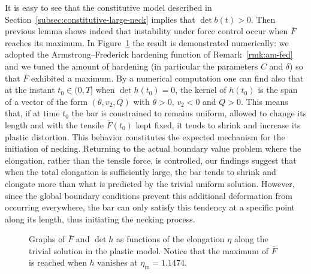 \documentclass[a4paper,10pt,twoside]{amsbook}
\numberwithin{section}{chapter}
\numberwithin{equation}{chapter}
\theoremstyle{definition}
\begin{document}
It is easy to see that the constitutive model described in Section~\ref{subsec:constitutive-large-neck} implies that $\det b(t)>0$. Then previous lemma shows indeed that instability under force control occur when $\bar F$ reaches its maximum. In Figure~\ref{fig:instabilitypl} the result is demonstrated numerically: we adopted the Armstrong--Frederick hardening function of Remark~\ref{rmk:am-fed} and we tuned the amount of hardening (in particular the parameters $C$ and $\delta$) so that $\bar{F}$ exhibited a maximum. By a numerical computation one can find also that at the instant $t_0\in(0,T]$ when $\det h(t_0)=0$, the kernel of $h(t_0)$ is the span of a vector of the form $(\theta,v_2,Q)$ with $\theta>0$, $v_2<0$ and $Q>0$. This means that, if at time $t_0$ the bar is constrained to remains uniform, allowed to change its length and with the tensile $\bar{F}(t_0)$ kept fixed, it tends to shrink and increase its plastic distortion. This behavior constitutes the expected mechanism for the initiation of necking. Returning to the actual boundary value problem where the elongation, rather than the tensile force, is controlled, our findings suggest that when the total elongation is sufficiently large, the bar tends to shrink and elongate more than what is predicted by the trivial uniform solution. However, since the global boundary conditions prevent this additional deformation from occurring everywhere, the bar can only satisfy this tendency at a specific point along its length, thus initiating the necking process.
\begin{figure}[htp]
\hfill
{}
\caption{Graphs of $\bar F$ and $\det h$ as functions of the elongation $\eta$ along the trivial solution in the plastic model. Notice that the maximum of $\bar{F}$ is reached when $h$ vanishes at $\eta_\text{m}=1.1474$.}
\label{fig:instabilitypl}
\end{figure}
\end{document}
